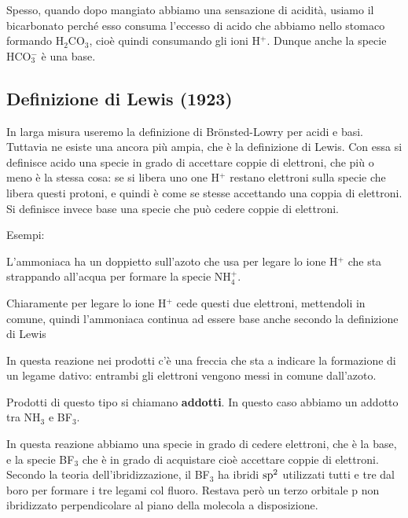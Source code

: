 Spesso, quando dopo mangiato abbiamo una sensazione di acidità, usiamo il bicarbonato perché esso consuma l'eccesso di acido che abbiamo nello stomaco formando H$_2$CO$_3$, cioè quindi consumando gli ioni H$^+$. Dunque anche la specie HCO$_3^-$ è una base.

\subsection{Definizione di Lewis (1923)}
In larga misura useremo la definizione di Brönsted-Lowry per acidi e basi. Tuttavia ne esiste una ancora più ampia, che è la definizione di Lewis. Con essa si definisce acido una specie in grado di accettare coppie di elettroni, che più o meno è la stessa cosa: se si libera uno one H$^+$ restano elettroni sulla specie che libera questi protoni, e quindi è come se stesse accettando una coppia di elettroni. Si definisce invece base una specie che può cedere coppie di elettroni.

\vspace{0.2cm}Esempi:

\vspace{0.2cm} 

\vspace{0.2cm}L'ammoniaca ha un doppietto sull'azoto che usa per legare lo ione H$^+$ che sta strappando all'acqua per formare la specie NH$_4^+$.

Chiaramente per legare lo ione H$^+$ cede questi due elettroni, mettendoli in comune, quindi l'ammoniaca continua ad essere base anche secondo la definizione di Lewis

\vspace{0.2cm}  

\vspace{0.2cm}In questa reazione nei prodotti c'è una freccia che sta a indicare la formazione di un legame dativo: entrambi gli elettroni vengono messi in comune dall'azoto.

Prodotti di questo tipo si chiamano \textbf{addotti}. In questo caso abbiamo un addotto tra NH$_3$ e BF$_3$.

In questa reazione abbiamo una specie in grado di cedere elettroni, che è la base, e la specie BF$_3$ che è in grado di acquistare cioè accettare coppie di elettroni. Secondo la teoria dell'ibridizzazione, il BF$_3$ ha ibridi $\rm sp^2$ utilizzati tutti e tre dal boro per formare i tre legami col fluoro. Restava però un terzo orbitale p non ibridizzato perpendicolare al piano della molecola a disposizione.

